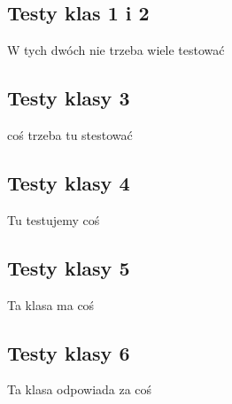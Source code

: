 \documentclass[a4paper,11pt]{article}
\newcommand\tab[1][0.6cm]{\hspace*{#1}}
\begin{document}
\subsection{Testy klas 1 i 2}

\tab W tych dwóch nie trzeba wiele testować

\subsection{Testy klasy 3}

\tab coś trzeba tu stestować

\subsection{Testy klasy 4}

\tab Tu testujemy coś


\subsection{Testy klasy 5}

\tab Ta klasa ma coś

\subsection{Testy klasy 6}

\tab Ta klasa odpowiada za coś
\end{document}
